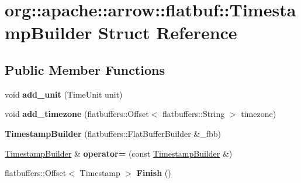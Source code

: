 \hypertarget{structorg_1_1apache_1_1arrow_1_1flatbuf_1_1TimestampBuilder}{}\section{org\+:\+:apache\+:\+:arrow\+:\+:flatbuf\+:\+:Timestamp\+Builder Struct Reference}
\label{structorg_1_1apache_1_1arrow_1_1flatbuf_1_1TimestampBuilder}
\subsection*{Public Member Functions}
\begin{DoxyCompactItemize}
\item 
void {\bfseries add\+\_\+unit} (Time\+Unit unit)\hypertarget{structorg_1_1apache_1_1arrow_1_1flatbuf_1_1TimestampBuilder_a505801f2dea82331c0f30fbec20e5a6b}{}\label{structorg_1_1apache_1_1arrow_1_1flatbuf_1_1TimestampBuilder_a505801f2dea82331c0f30fbec20e5a6b}

\item 
void {\bfseries add\+\_\+timezone} (flatbuffers\+::\+Offset$<$ flatbuffers\+::\+String $>$ timezone)\hypertarget{structorg_1_1apache_1_1arrow_1_1flatbuf_1_1TimestampBuilder_ab5395969a9edeb4b4484caaea81fa93e}{}\label{structorg_1_1apache_1_1arrow_1_1flatbuf_1_1TimestampBuilder_ab5395969a9edeb4b4484caaea81fa93e}

\item 
{\bfseries Timestamp\+Builder} (flatbuffers\+::\+Flat\+Buffer\+Builder \&\+\_\+fbb)\hypertarget{structorg_1_1apache_1_1arrow_1_1flatbuf_1_1TimestampBuilder_af6c50867d5129e0340cff7b14cab1683}{}\label{structorg_1_1apache_1_1arrow_1_1flatbuf_1_1TimestampBuilder_af6c50867d5129e0340cff7b14cab1683}

\item 
\hyperlink{structorg_1_1apache_1_1arrow_1_1flatbuf_1_1TimestampBuilder}{Timestamp\+Builder} \& {\bfseries operator=} (const \hyperlink{structorg_1_1apache_1_1arrow_1_1flatbuf_1_1TimestampBuilder}{Timestamp\+Builder} \&)\hypertarget{structorg_1_1apache_1_1arrow_1_1flatbuf_1_1TimestampBuilder_afa1a89279d78922068b9929f1d328981}{}\label{structorg_1_1apache_1_1arrow_1_1flatbuf_1_1TimestampBuilder_afa1a89279d78922068b9929f1d328981}

\item 
flatbuffers\+::\+Offset$<$ Timestamp $>$ {\bfseries Finish} ()\hypertarget{structorg_1_1apache_1_1arrow_1_1flatbuf_1_1TimestampBuilder_acc5f4877150671a98b188a1eca8d7d90}{}\label{structorg_1_1apache_1_1arrow_1_1flatbuf_1_1TimestampBuilder_acc5f4877150671a98b188a1eca8d7d90}

\end{DoxyCompactItemize}
